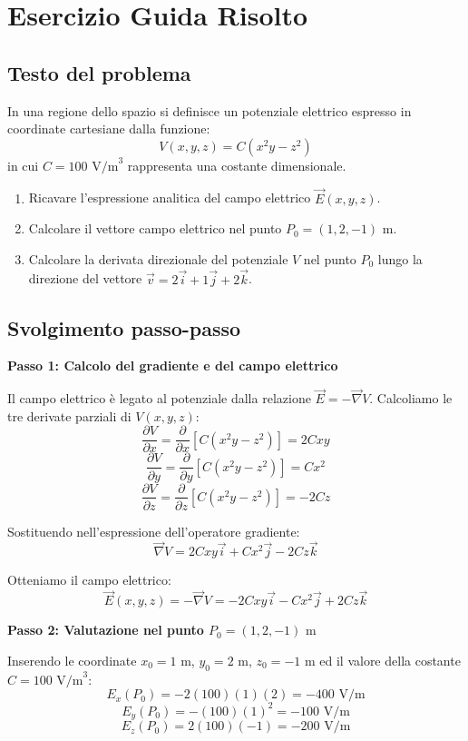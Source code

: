 \documentclass[12pt, a4paper]{article}
\begin{document}
	\section{Esercizio Guida Risolto}
	
	\subsection{Testo del problema}
	In una regione dello spazio si definisce un potenziale elettrico espresso in coordinate cartesiane dalla funzione:
	\[
	V(x, y, z) = C (x^2 y - z^2)
	\]
	in cui $C = 100 \text{ V/m}^3$ rappresenta una costante dimensionale.
	\begin{enumerate}
		\item Ricavare l'espressione analitica del campo elettrico $\vec{E}(x, y, z)$.
		\item Calcolare il vettore campo elettrico nel punto $P_0 = (1, 2, -1) \text{ m}$.
		\item Calcolare la derivata direzionale del potenziale $V$ nel punto $P_0$ lungo la direzione del vettore $\vec{v} = 2\vec{i} + 1\vec{j} + 2\vec{k}$.
	\end{enumerate}
	
	\subsection{Svolgimento passo-passo}
	
	\textbf{Passo 1: Calcolo del gradiente e del campo elettrico}
	
	Il campo elettrico è legato al potenziale dalla relazione $\vec{E} = -\vec{\nabla}V$.
	Calcoliamo le tre derivate parziali di $V(x,y,z)$:
	\[
	\frac{\partial V}{\partial x} = \frac{\partial}{\partial x} \left[ C(x^2 y - z^2) \right] = 2 C x y
	\]
	\[
	\frac{\partial V}{\partial y} = \frac{\partial}{\partial y} \left[ C(x^2 y - z^2) \right] = C x^2
	\]
	\[
	\frac{\partial V}{\partial z} = \frac{\partial}{\partial z} \left[ C(x^2 y - z^2) \right] = -2 C z
	\]
	
	Sostituendo nell'espressione dell'operatore gradiente:
	\[
	\vec{\nabla}V = 2Cxy \vec{i} + Cx^2 \vec{j} - 2Cz \vec{k}
	\]
	
	Otteniamo il campo elettrico:
	\[
	\vec{E}(x,y,z) = -\vec{\nabla}V = -2Cxy \vec{i} - Cx^2 \vec{j} + 2Cz \vec{k}
	\]
	
	\textbf{Passo 2: Valutazione nel punto $P_0 = (1, 2, -1) \text{ m}$}
	
	Inserendo le coordinate $x_0 = 1 \text{ m}$, $y_0 = 2 \text{ m}$, $z_0 = -1 \text{ m}$ ed il valore della costante $C = 100 \text{ V/m}^3$:
	\[
	E_x(P_0) = -2 (100) (1) (2) = -400 \text{ V/m}
	\]
	\[
	E_y(P_0) = -(100) (1)^2 = -100 \text{ V/m}
	\]
	\[
	E_z(P_0) = 2 (100) (-1) = -200 \text{ V/m}
	\]
	
\end{document}
